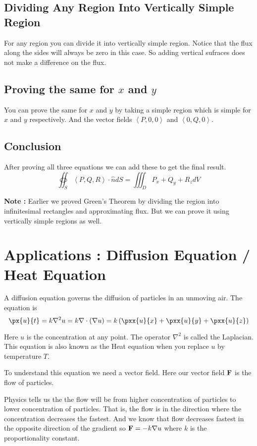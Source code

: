 \subsection{Dividing Any Region Into Vertically Simple Region}

For any region you can divide it into vertically simple region.
Notice that the flux along the sides will always be zero in this case. 
So adding vertical sufraces does not make a difference on the flux.

\subsection{Proving the same for $x$ and $y$}

You can prove the same for $x$ and $y$ by taking a simple region which is simple for $x$ and $y$ respectively.
And the vector fields $\left< P, 0, 0 \right>$ and $\left< 0, Q, 0 \right>$.

\subsection{Conclusion}

After proving all three equations we can add these to get the final result.
$$ \oiint_S \left< P, Q, R \right> \cdot \hat{n} dS = \iiint_D P_x + Q_y + R_z dV $$

{\bf Note : } Earlier we proved Green's Theorem by dividing the region into infinitesimal rectangles and approximating flux.
But we can prove it using vertically simple regions as well.

\pagebreak

\section{Applications : Diffusion Equation / Heat Equation}

A diffusion equation governs the diffusion of particles in an unmoving air.
The equation is 
$$ \px{u}{t} = k \nabla^2 u = k \nabla \cdot (\nabla u) = k \left( \pxx{u}{x} + \pxx{u}{y} + \pxx{u}{z}  \right) $$

Here $u$ is the concentration at any point. The operator $\nabla^2$ is called the Laplacian.
This equation is also known as the Heat equation when you replace $u$ by temperature $T$.

To understand this equation we need a vector field.
Here our vector field ${\bf F}$ is the flow of particles.

Physics tells us the the flow will be from higher concentration of particles to lower concentration of particles.
That is, the flow is in the direction where the concentration decreases the fastest. 
And we know that flow decreases fastest in the opposite direction of the gradient so ${\bf F} = - k \nabla u$ where $k$ is the proportionality constant.

